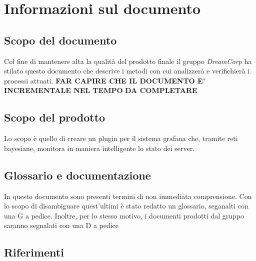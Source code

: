\section{Informazioni sul documento}
\subsection{Scopo del documento}
 Col fine di mantenere alta la qualità del prodotto finale il gruppo \textit{DreamCorp} ha stilato questo documento che descrive i metodi con cui analizzerà e verifichierà i processi attuati. \textbf{FAR CAPIRE CHE IL DOCUMENTO E' INCREMENTALE NEL TEMPO}
 \textbf{DA COMPLETARE}
 \subsection{Scopo del prodotto}
 Lo scopo è quello di creare un plugin per il sistema grafana che, tramite reti bayesiane, monitora in maniera intelligente lo stato dei server.
 \subsection{Glossario e documentazione}
 In questo documento sono presenti termini di non immediata comprensione. Con lo scopo di disambiguare quest'ultimi è stato redatto un glossario, seganalti con una G a pedice.
 Inoltre, per lo stesso motivo, i documenti prodotti dal gruppo saranno segnalati con una D a pedice
 \newpage
 \subsection{Riferimenti}